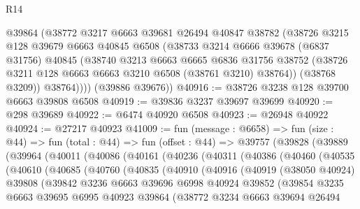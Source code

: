 \begin{lexlean}{R14}
\begin{coremodule}
          @39864
          (@38772
            @3217
            @6663
            @39681
            @26494
            @40847
            @38782
            (@38726
              @3215
              @128
              @39679
              @6663
              @40845
              @6508
              (@38733
                @3214
                @6666
                @39678
                (@6837 @31756)
                @40845
                (@38740
                  @3213
                  @6663
                  @6665
                  @6836
                  @31756
                  @38752
                  (@38726 @3211 @128 @6663 @6663 @3210 @6508 (@38761 @3210) @38764))
                (@38768 @3209))
              @38764))))
      (@39886 @39676))
@40916 := @38726 @3238 @128 @39700 @6663 @39808 @6508
@40919 := @39836 @3237 @39697 @39699
@40920 := @298 @39689
@40922 := @6474 @40920 @6508
@40923 := @26948 @40922
@40924 := @27217 @40923
@41009 := fun (message : @6658) =>
  fun (size : @44) =>
  fun (total : @44) =>
  fun (offset : @44) =>
  @39757
    (@39828
      (@39889
        (@39964
          (@40011
            (@40086
              (@40161
                (@40236
                  (@40311
                    (@40386
                      (@40460
                        (@40535
                          (@40610
                            (@40685
                              (@40760
                                (@40835
                                  (@40910
                                    (@40916
                                      (@40919
                                        (@38050 @40924)
                                        @39808
                                        (@39842
                                          @3236
                                          @6663
                                          @39696
                                          @6998
                                          @40924
                                          @39852
                                          (@39854
                                            @3235
                                            @6663
                                            @39695
                                            @6995
                                            @40923
                                            @39864
                                            (@38772
                                              @3234
                                              @6663
                                              @39694
                                              @26494

\end{coremodule}
\end{lexlean}
